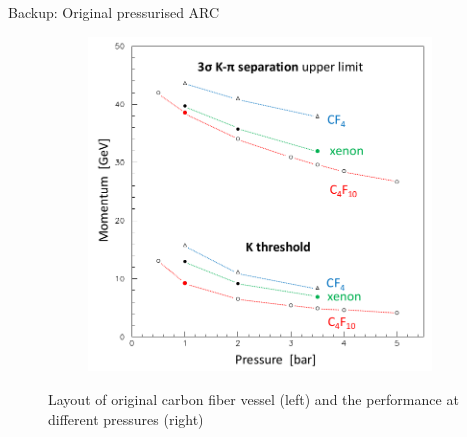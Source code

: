 \documentclass{beamer}
\begin{document}
\begin{frame}{Backup: Original pressurised ARC}
\begin{figure}
\begin{subfigure}{0.35\textwidth}
      \includegraphics[width = 1.0\textwidth]{Plots/Significance_vs_Pressure.png}
    \end{subfigure}
    \caption{Layout of original carbon fiber vessel (left) and the performance at different pressures (right)}
  \end{figure}
\end{frame}
\end{document}
